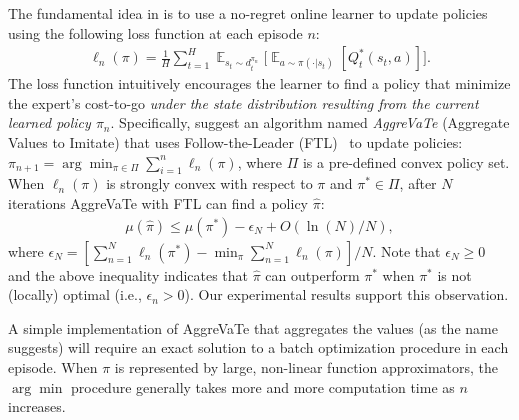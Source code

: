 \documentclass{article}
\newcommand{\BB}[1]{\textcolor{red}{\bf Byron: {#1}}}
\newcommand{\drew}[1]{\textcolor{blue}{\bf Drew: {#1}}}
\begin{document}
The fundamental idea in \citet{ross2014reinforcement} is to use a no-regret online learner to update policies using the following loss function at each episode $n$:
\begin{align}
\label{eq:general_loss}
\ell_{n}(\pi) = \frac{1}{H}\sum_{t=1}^H \mathop{\mathbb{E}}_{s_t\sim d_t^{\pi_n}}\Big[\mathop{\mathbb{E}}_{a \sim \pi(\cdot | s_t)}[Q_t^*(s_t,a)]\Big].
\end{align}
The loss function intuitively encourages the learner to find a policy that minimize the expert's cost-to-go \emph{under the state distribution resulting from the current learned policy $\pi_n$}.
Specifically, \citet{ross2014reinforcement} suggest an algorithm named \emph{AggreVaTe} (Aggregate Values to Imitate) that uses Follow-the-Leader (FTL)~\cite{shalev2012online} to update policies: $\pi_{n+1} = \arg\min_{\pi\in\Pi}\sum_{i=1}^{n}\ell_n(\pi)$, %
where $\Pi$ is a pre-defined convex policy set.
When $\ell_n(\pi)$ is strongly convex with respect to $\pi$ and $\pi^*\in \Pi$, after $N$ iterations AggreVaTe with FTL can find a policy $\hat{\pi}$:
\begin{align}
\label{eq:AggreVaTe_analysis}
\mu(\hat{\pi}) \leq \mu(\pi^*) - \epsilon_N + {O}(\ln(N)/{N}),
\end{align} where $\epsilon_N =[\sum_{n=1}^N\ell_n(\pi^*) - \min_{\pi}\sum_{n=1}^N\ell_n(\pi)]/N$. Note that $\epsilon_N\geq 0$ and the above inequality indicates that $\hat{\pi}$ can outperform $\pi^*$ when $\pi^*$ is not (locally) optimal (i.e., $\epsilon_n > 0$). Our experimental results support this observation.

A simple implementation of AggreVaTe that aggregates the values (as the name suggests) will require an exact solution to a batch optimization procedure in each episode. 
When $\pi$ is represented by large, non-linear function approximators, the $\arg\min$ procedure generally takes more and more computation time as $n$ increases. %
\end{document}
